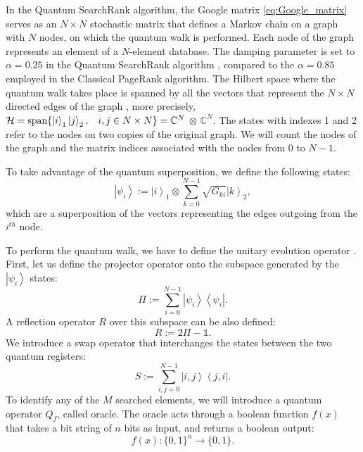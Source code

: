 \documentclass[nofootinbib,aps,prd,reprint,superscriptaddress,floatfix]{revtex4-2}
\begin{document}
In the Quantum SearchRank algorithm, the Google matrix \eqref{eq:Google_matrix} serves as an $N \times N$ stochastic matrix that defines a Markov chain on a graph with $N$ nodes, on which the quantum walk is performed. Each node of the graph represents an element of a $N$-element database. The damping parameter is set to $\alpha=0.25$ in the Quantum SearchRank algorithm \cite{Searchrank}, compared to the $\alpha=0.85$ employed in the Classical PageRank algorithm. The Hilbert space where the quantum walk takes place is spanned by all the vectors that represent the $N \times N$ directed edges of the graph \cite{Paparo2}, more precisely, $\mathcal{H}= \text{span} \{\ket{i}_{1}\ket{j}_{2}, \hspace{0.3cm} i,j \in N \times N \} = \mathbb{C}^{N}$ $\otimes$ $\mathbb{C}^{N} $. The states with indexes 1 and 2 refer to the nodes on two copies of the original graph. We will count the nodes of the graph and the matrix indices associated with the nodes from 0 to $N-1$.

To take advantage of the quantum superposition, we define the following states:
\begin{equation}\label{eq:psi_i}
	\left|\psi_i\right> := \left|i\right>_1 \otimes \sum_{k=0}^{N-1} \sqrt{G_{ki}}\left|k\right>_2,
\end{equation}
which are a superposition of the vectors representing the edges outgoing from the $i^{th}$ node.

To perform the quantum walk, we have to define the unitary evolution operator \cite{Notes}. First, let us define the projector operator onto the subspace generated by the $\left|\psi_i\right>$ states:
\begin{equation}
    \Pi := \sum_{i=0}^{N-1}\left|\psi_i\right>\left<\psi_i\right|.
\end{equation}
A reflection operator $R$ over this subspace can be also defined:
\begin{equation}
    R:=2\Pi-\mathds{1}.
\end{equation}
We introduce a swap operator that interchanges the states between the two quantum registers:
\begin{equation}
    S:=\sum_{i,j=0}^{N-1}\left|i,j\right>\left< j,i\right|.
\end{equation}
To identify any of the $M$ searched elements, we will introduce a quantum operator $Q_{f}$, called oracle.
The oracle acts through a boolean function $f(x)$ that takes a bit string of $n$ bits as input, and returns a boolean output:
\begin{equation}\label{eq:f}
    f(x):\{0,1\}^n\xrightarrow{}\{0,1\}.
\end{equation}
\end{document}
